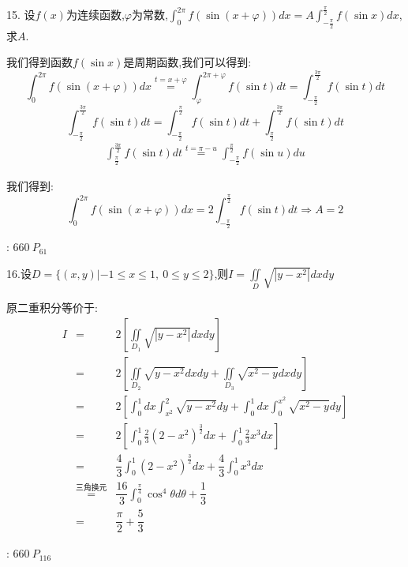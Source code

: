 15. 设$f(x)$为连续函数,$\varphi$为常数,$\int_{0}^{2\pi}f(\sin(x+\varphi))dx=A\int_{-\frac{\pi}{2}}^{\frac{\pi}{2}}f(\sin x)dx$,求$A$.
\begin{solution}
	
	我们得到函数$f(\sin x)$是周期函数,我们可以得到:  
	$$\int_{0}^{2\pi}f(\sin(x+\varphi))dx\overset{t=x+\varphi}{=}\int_{\varphi}^{2\pi+\varphi}f(\sin t)dt=\int_{-\frac{\pi}{2}}^{\frac{3\pi}{2}}f(\sin t)dt$$
	$$\int_{-\frac{\pi}{2}}^{\frac{3\pi}{2}}f(\sin t)dt=\int_{-\frac{\pi}{2}}^{\frac{\pi}{2}}f(\sin t)dt+\int_{\frac{\pi}{2}}^{\frac{3\pi}{2}}f(\sin t)dt$$
	\begin{eqnarray*}
		\int_{\frac{\pi}{2}}^{\frac{3\pi}{2}}f(\sin t)dt\overset{t=\pi-u}{=}\int_{-\frac{\pi}{2}}^{\frac{\pi}{2}}f(\sin u)du
	\end{eqnarray*}

	我们得到:  $$\int_{0}^{2\pi}f(\sin(x+\varphi))dx=2\int_{-\frac{\pi}{2}}^{\frac{\pi}{2}}f(\sin t)dt\Rightarrow A=2$$
\end{solution}
\begin{anymark}[注]
	[题目来源]:  $660 \ P_{61}$
\end{anymark}

16.设$D=\{(x,y)|-1\leq x\leq 1,\ 0\leq y\leq 2\}$,则$I=\iint\limits_{D}\sqrt{|y-x^2|}dxdy$
\begin{solution}
	
	原二重积分等价于:  
	\begin{eqnarray*}
		I&=&2[\iint\limits_{D_{1}}\sqrt{|y-x^2|}dxdy]\\
		 &=&2[\iint\limits_{D_{2}}\sqrt{y-x^2}dxdy+\iint\limits_{D_{3}}\sqrt{x^2-y}dxdy]\\
		 &=&2[\int_{0}^{1}dx\int_{x^2}^{2}\sqrt{y-x^2}dy+\int_{0}^{1}dx\int_{0}^{x^2}\sqrt{x^2-y}dy]\\
		 &=&2[\int_{0}^{1}\frac{2}{3}(2-x^2)^{\frac{3}{2}}dx+\int_{0}^{1}\frac{2}{3}x^3dx]\\
		 &=&\dfrac{4}{3}\int_{0}^{1}(2-x^2)^{\frac{3}{2}}dx+\dfrac{4}{3}\int_{0}^{1}x^3dx\\
		 &\overset{\text{三角换元}}{=}&\dfrac{16}{3}\int_{0}^{\frac{\pi}{4}}\cos^4 \theta d\theta+\dfrac{1}{3}\\
		 &=&\dfrac{\pi}{2}+\dfrac{5}{3}
	\end{eqnarray*}
\end{solution}
\begin{anymark}[注]
	[题目来源]:  $660 \ P_{116}$
\end{anymark}

